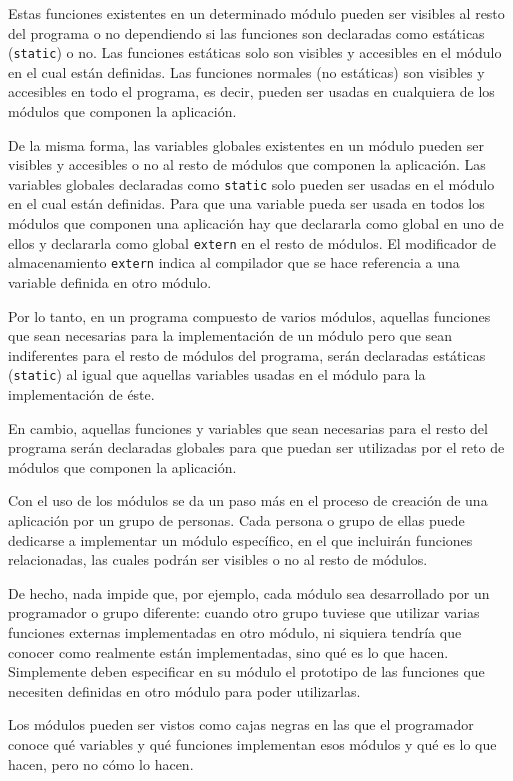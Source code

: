 Estas funciones existentes en un determinado módulo pueden ser visibles al resto del programa o no dependiendo si las funciones son declaradas como estáticas (\texttt{static}) o no. Las funciones estáticas solo son visibles y accesibles en el módulo en el cual están definidas. Las funciones normales (no estáticas) son visibles y accesibles en todo el programa, es decir, pueden ser usadas en cualquiera de los módulos que componen la aplicación.

De la misma forma, las variables globales existentes en un módulo pueden ser visibles y accesibles o no al resto de módulos que componen la aplicación. Las variables globales declaradas como \texttt{static} solo pueden ser usadas en el módulo en el cual están definidas. Para que una variable pueda ser usada en todos los módulos que componen una aplicación hay que declararla como global en uno de ellos y declararla como global \texttt{extern} en el resto de módulos. El modificador de almacenamiento \texttt{extern} indica al compilador que se hace referencia a una variable definida en otro módulo.

Por lo tanto, en un programa compuesto de varios módulos, aquellas funciones que sean necesarias para la implementación de un módulo pero que sean indiferentes para el resto de módulos del programa, serán declaradas estáticas (\texttt{static}) al igual que aquellas variables usadas en el módulo para la implementación de éste.

En cambio, aquellas funciones y variables que sean necesarias para el resto del programa serán declaradas globales para que puedan ser utilizadas por el reto de módulos que componen la aplicación.

Con el uso de los módulos se da un paso más en el proceso de creación de una aplicación por un grupo de personas. Cada persona o grupo de ellas puede dedicarse a implementar un módulo específico, en el que incluirán funciones relacionadas, las cuales podrán ser visibles o no al resto de módulos.

De hecho, nada impide que, por ejemplo, cada módulo sea desarrollado por un programador o grupo diferente: cuando otro grupo tuviese que utilizar varias funciones externas implementadas en otro módulo, ni siquiera tendría que conocer como realmente están implementadas, sino qué es lo que hacen. Simplemente deben especificar en su módulo el prototipo de las funciones que necesiten definidas en otro módulo para poder utilizarlas.

Los módulos pueden ser vistos como cajas negras en las que el programador conoce qué variables y qué funciones implementan esos módulos y qué es lo que hacen, pero no cómo lo hacen.

